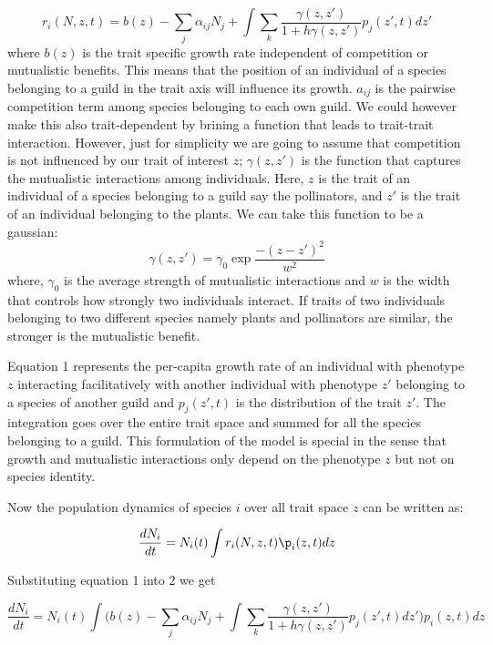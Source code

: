 \documentclass{elsarticle}
\begin{document}
\begin{equation}
r_i(N,z,t) = b(z) -  \sum_{j}\alpha_{ij}N_{j} + \int \sum_{k} \frac{\gamma(z,z')}{1+ h\gamma(z,z')} p_{j}(z',t)dz'
\end{equation}
where $b(z)$ is the trait specific growth rate independent of competition or mutualistic benefits. This means that the position of an individual of a species belonging to a guild in the trait axis will influence its growth.
$a_{ij}$ is the pairwise competition term among species belonging to each own guild. We could however make this also trait-dependent by brining a function that leads to trait-trait interaction. However, just for simplicity we are going to assume that competition is not influenced by our trait of interest $z$; $\gamma(z,z')$ is the function that captures the mutualistic interactions among individuals. Here, $z$ is the trait of an individual of a species belonging to a guild say the pollinators, and $z'$ is the trait of an individual belonging to the plants. We can take this function to be a gaussian:
$$\gamma(z,z') = \gamma_{0} \exp{\frac{-(z-z')^2}{w^2}}$$
where, $\gamma_{0}$ is the average strength of mutualistic interactions and $w$ is the width that controls how strongly two individuals interact. If traits of two individuals belonging to two different species namely plants and pollinators are similar, the stronger is the mutualistic benefit. 

Equation 1 represents the per-capita growth rate of an individual with phenotype $z$ interacting facilitatively with another individual with phenotype $z'$ belonging to a species of another guild and  $p_{j}(z',t)$ is the distribution of the trait $z'$. The integration goes over the entire trait space and summed for all the species belonging to a guild. This  formulation of the model is special in the sense that growth and mutualistic interactions only depend on the phenotype $z$ but not on species identity. 

Now the population dynamics of species $i$ over all trait space $z$ can be written as:

\begin{equation}
    \frac{dN_{i}}{dt} = N_{i}(t) \int r_i(N,z,t) \p_{i}(z,t)dz
\end{equation}

Substituting equation 1 into 2 we get


\begin{equation}
    \frac{dN_{i}}{dt} = N_{i}(t) \int \Bigg( b(z) -  \sum_{j}\alpha_{ij}N_{j} + \int \sum_{k} \frac{\gamma(z,z')}{1+ h\gamma(z,z')} p_{j}(z',t)dz'\Bigg)  p_{i}(z,t)dz
\end{equation}
\end{document}
